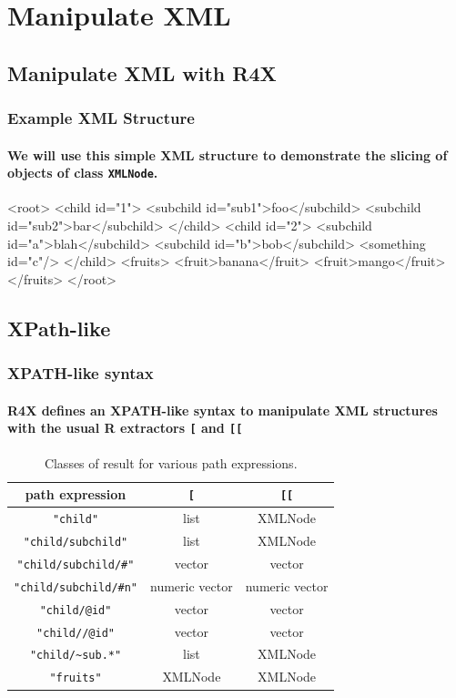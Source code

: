\documentclass[smaller]{beamer}
\newcommand{\rfun}[1]{\texttt{#1}}
\begin{document}
\section{Manipulate XML}

\subsection{Manipulate XML with R4X}


\begin{frame}[fragile]
\frametitle{Example XML Structure}
\framesubtitle{We will use this simple XML structure to demonstrate the slicing of objects of class \rfun{XMLNode}. } 

\begin{Schunk}
\begin{Soutput}
<root>
 <child id="1">
  <subchild id="sub1">foo</subchild>
  <subchild id="sub2">bar</subchild>
 </child>
 <child id="2">
  <subchild id="a">blah</subchild>
  <subchild id="b">bob</subchild>
  <something id="c"/>
 </child>
 <fruits>
  <fruit>banana</fruit>
  <fruit>mango</fruit>
 </fruits>
</root>
\end{Soutput}
\end{Schunk}

\end{frame}

\subsection{XPath-like}

\begin{frame}[fragile]
\frametitle{XPATH-like syntax}
\framesubtitle{R4X defines an XPATH-like syntax to manipulate XML structures with the usual R extractors \texttt{[} and \texttt{[[}} 

\begin{table}
 \centering
\begin{tabular}{|c|c|c|}
\hline
path expression & \rfun{[}  & \texttt{[[}  \\ 
\hline
\texttt{"child"} & list  & XMLNode  \\
\texttt{"child/subchild"} & list & XMLNode \\
\texttt{"child/subchild/\#"} & vector & vector \\
\texttt{"child/subchild/\#n"} & numeric vector & numeric vector \\
\texttt{"child/@id"} & vector & vector \\
\texttt{"child//@id"} & vector & vector \\
\texttt{"child/\~{}sub.*"} & list & XMLNode \\
\texttt{"fruits"} & XMLNode & XMLNode \\
\hline
\end{tabular}
\caption{Classes of result for various path expressions.}
\end{table}

\end{frame}
\end{document}
